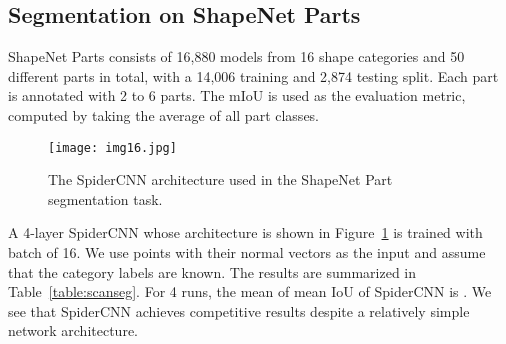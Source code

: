 \documentclass[runningheads]{llncs}
\begin{document}
\subsection{Segmentation on ShapeNet Parts}


ShapeNet Parts consists of 16,880 models from 16 shape categories and 50 different parts in total, with a 14,006 training and 2,874 testing split. Each part is annotated with 2 to 6 parts. The mIoU is used as the evaluation metric, computed by taking the average of all part classes.
\begin{figure}
\centering
\texttt{[image: img16.jpg]} 
\caption{The SpiderCNN architecture used in the ShapeNet Part segmentation task.}
\label{fig:pargsegarch}
\end{figure}
A 4-layer SpiderCNN whose architecture is shown in Figure~\ref{fig:pargsegarch} is trained with batch of 16. We use points with their normal vectors as the input and assume that the category labels are known. The results are summarized in Table~\ref{table:scanseg}. For 4 runs, the mean of mean IoU of SpiderCNN is . We see that SpiderCNN achieves competitive results despite a relatively simple network architecture.
\end{document}
